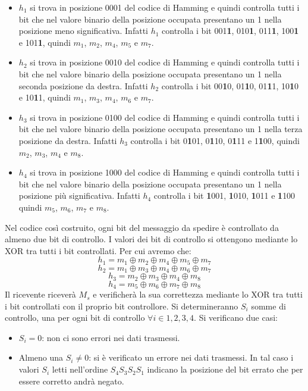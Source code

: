 \documentclass[12pt]{report}
\begin{document}
	\begin{itemize}
		\item $h_1$ si trova in posizione 0001 del codice di Hamming e quindi controlla tutti i bit che nel valore binario della posizione occupata presentano un 1 nella posizione meno significativa. Infatti $h_1$ controlla i bit 001\textbf{1}, 010\textbf{1}, 011\textbf{1}, 100\textbf{1} e 101\textbf{1}, quindi $m_1$, $m_2$, $m_4$, $m_5$ e $m_7$.
		\item $h_2$ si trova in posizione 0010 del codice di Hamming e quindi controlla tutti i bit che nel valore binario della posizione occupata presentano un 1 nella seconda posizione da destra. Infatti $h_2$ controlla i bit 00\textbf{1}0, 01\textbf{1}0, 01\textbf{1}1, 10\textbf{1}0 e 10\textbf{1}1, quindi $m_1$, $m_3$, $m_4$, $m_6$ e $m_7$.
		\item $h_3$ si trova in posizione 0100 del codice di Hamming e quindi controlla tutti i bit che nel valore binario della posizione occupata presentano un 1 nella terza posizione da destra. Infatti $h_3$ controlla i bit 0\textbf{1}01, 0\textbf{1}10, 0\textbf{1}11 e 1\textbf{1}00, quindi $m_2$, $m_3$, $m_4$ e $m_8$.
		\item $h_4$ si trova in posizione 1000 del codice di Hamming e quindi controlla tutti i bit che nel valore binario della posizione occupata presentano un 1 nella posizione più significativa. Infatti $h_4$ controlla i bit \textbf{1}001, \textbf{1}010, \textbf{1}011 e \textbf{1}100 quindi $m_5$, $m_6$, $m_7$ e $m_8$.
	\end{itemize}
	Nel codice così costruito, ogni bit del messaggio da spedire è controllato da almeno due bit di controllo. I valori dei bit di controllo si ottengono mediante lo XOR tra tutti i bit controllati. Per cui avremo che:
	\begin{equation*}
		h_1 = m_1 \oplus m_2 \oplus m_4 \oplus m_5 \oplus m_7	
	\end{equation*}
	\begin{equation*}
		h_2 = m_1 \oplus m_3 \oplus m_4 \oplus m_6 \oplus m_7
	\end{equation*}
	\begin{equation*}
		h_3 = m_2 \oplus m_3 \oplus m_4 \oplus m_8
	\end{equation*}
	\begin{equation*}
		h_4 = m_5 \oplus m_6 \oplus m_7 \oplus m_8
	\end{equation*}
	Il ricevente riceverà $M_s$ e verificherà la sua correttezza mediante lo XOR tra tutti i bit controllati con il proprio bit controllore. Si determineranno $S_i$ somme di controllo, una per ogni bit di controllo $\forall i \in {1,2,3,4}$. 
	Si verificano due casi:
	\begin{itemize}
		\item $S_i = 0$: non ci sono errori nei dati trasmessi.
		\item Almeno una $S_i \neq 0$: si è verificato un errore nei dati trasmessi. In tal caso i valori $S_i$ letti nell'ordine $S_4S_3S_2S_1$ indicano la posizione del bit errato che per essere corretto andrà negato.
	\end{itemize}
\end{document}
